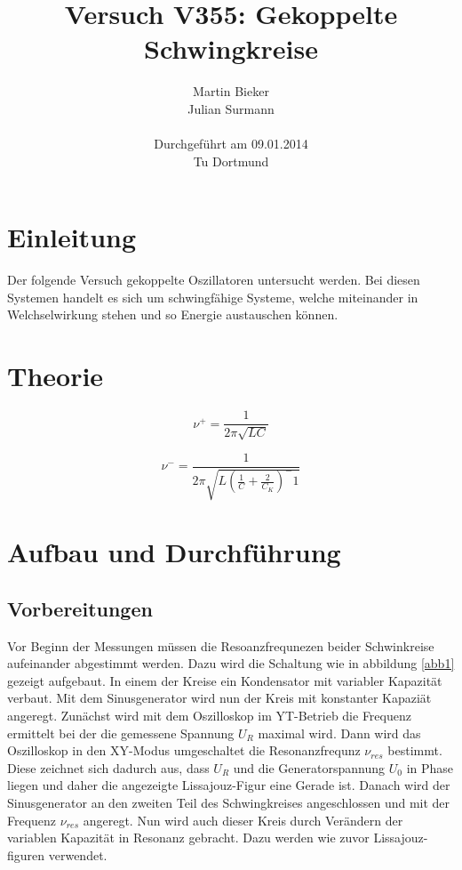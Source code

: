\documentclass[11pt,ngerman,a4paper]{article}
\title{\textbf{Versuch V355: Gekoppelte Schwingkreise}}
\author{Martin Bieker\\
		Julian Surmann\\
		\\
		Durchgef\"{u}hrt am 09.01.2014\\
		Tu Dortmund}
\date{}
\begin{document}
\renewcommand\tablename{Tabelle}
\renewcommand\figurename{Abbildung}
\maketitle
\thispagestyle{empty}
\newpage
\clearpage
\setcounter{page}{1}


\section{Einleitung}
Der folgende Versuch gekoppelte Oszillatoren untersucht werden. Bei diesen Systemen handelt es sich um schwingfähige Systeme, welche miteinander in Welchselwirkung stehen und so Energie austauschen können. 

\section{Theorie}
\begin{equation}
\nu^+ = \frac{1}{2 \pi \sqrt{LC}}
\end{equation}

\begin{equation}
\nu^- =\frac1{2\pi\sqrt{L(\frac1C + \frac2{C_K})^-1}}
\end{equation}


\section{Aufbau und Durchf\"{u}hrung}
\subsection{Vorbereitungen}
Vor Beginn der Messungen müssen die Resoanzfrequnezen beider Schwinkreise aufeinander abgestimmt werden. Dazu wird die Schaltung wie in abbildung \ref{abb1} gezeigt aufgebaut. In einem der Kreise ein Kondensator mit variabler Kapazität verbaut. Mit dem Sinusgenerator wird nun der Kreis mit konstanter Kapazi\"at angeregt. Zunächst wird mit dem Oszilloskop im YT-Betrieb die Frequenz ermittelt bei der die gemessene Spannung $U_R$ maximal wird. Dann wird das Oszilloskop in den XY-Modus umgeschaltet die Resonanzfrequnz $\nu_{res}$ bestimmt. Diese zeichnet sich dadurch aus, dass $U_R$ und die Generatorspannung $U_0$ in Phase liegen und daher die angezeigte Lissajouz-Figur eine Gerade ist. Danach wird der Sinusgenerator an den zweiten Teil des Schwingkreises angeschlossen und mit der Frequenz $\nu_{res}$ angeregt. Nun wird auch dieser Kreis durch Verändern der variablen Kapazität in Resonanz gebracht. Dazu werden wie zuvor Lissajouz-figuren verwendet. 
\end{document}
